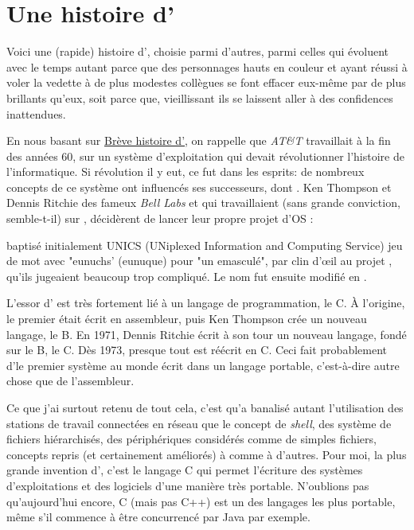 
\section{Une histoire d'\unix}
Voici une (rapide) histoire d'\unix{}, choisie parmi d'autres, parmi celles qui évoluent avec le temps autant parce que des personnages hauts en couleur et ayant réussi à voler la vedette à de plus modestes collègues se font effacer eux-même par de plus brillants qu'eux, soit parce que, vieillissant ils se laissent aller à des confidences inattendues.

En nous basant sur \href{http://www.tuteurs.ens.fr/unix/histoire.html}{Brève histoire d'\unix}, on rappelle que \emph{AT\&T} travaillait à la fin des années 60, sur un système d'exploitation \href{http://fr.wikipedia.org/wiki/Multics}{\multics} qui devait révolutionner l'histoire de l'informatique. Si révolution il y eut, ce fut dans les esprits: de nombreux concepts de ce système ont influencés ses successeurs, dont \unix. Ken Thompson et Dennis Ritchie des fameux \emph{Bell Labs} et qui travaillaient (sans grande conviction, semble-t-il) sur \multics, décidèrent de lancer leur propre projet d'OS : 

\begin{Quote}
baptisé initialement UNICS
(UNiplexed Information and Computing Service)
jeu de mot avec "eunuchs' (eunuque) pour "un \multics emasculé", par clin d'œil au projet \multics, qu'ils jugeaient beaucoup trop compliqué. Le nom fut ensuite modifié en \unix.
\end{Quote}

\begin{Quote}
L'essor d'\unix 
{}
est très fortement lié à un langage de programmation, le C. À l'origine, le premier \unix était écrit en assembleur, puis Ken Thompson crée un nouveau langage, le B. En 1971, Dennis Ritchie écrit à son tour un nouveau langage, fondé sur le B, le C. Dès 1973, presque tout \unix est réécrit en C. Ceci fait probablement d'\unix le premier système au monde écrit dans un langage portable, c'est-à-dire autre chose que de l'assembleur.
\end{Quote}

Ce que j'ai surtout retenu de tout cela,  c'est qu'\unix a banalisé autant l'utilisation des stations de travail connectées en réseau que le concept de \emph{shell}, des système de fichiers hiérarchisés, des périphériques considérés comme de simples fichiers, concepts repris (et certainement améliorés) à \multics comme à d'autres. Pour moi, la plus grande invention d'\unix, c'est le langage C qui permet l'écriture des systèmes d'exploitations et des logiciels d'une manière très portable. N'oublions pas qu'aujourd'hui encore, C (mais pas C++) est un des langages les plus portable, même s'il commence à être concurrencé par Java par exemple.
